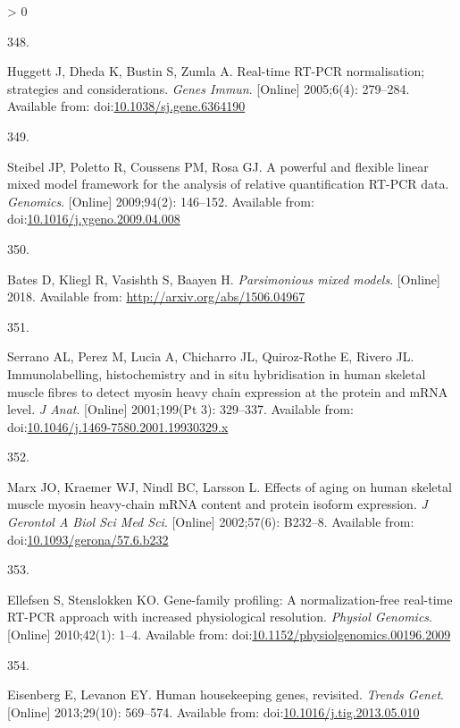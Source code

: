 \documentclass[twoside,10pt]{gihclass} %
\newlength{\cslhangindent}
\newlength{\csllabelwidth}
\newenvironment{CSLReferences}[3] %
 {%
  \setlength{\parindent}{0pt}
  \ifodd #1 \everypar{\setlength{\hangindent}{\cslhangindent}}\ignorespaces\fi
  \ifnum #2 > 0
  \setlength{\parskip}{#2\baselineskip}
  \fi
 }%
 {}
\newcommand{\CSLLeftMargin}[1]{\parbox[t]{\maxof{\widthof{#1}}{\csllabelwidth}}{#1}}
\newcommand{\CSLRightInline}[1]{\parbox[t]{\linewidth}{#1}}
\begin{document}
\begin{CSLReferences}{0}{0}
\leavevmode\hypertarget{ref-RN1984}{}%
\CSLLeftMargin{348. }
\CSLRightInline{Huggett J, Dheda K, Bustin S, Zumla A. Real-time RT-PCR normalisation; strategies and considerations. \emph{Genes Immun}. {[}Online{]} 2005;6(4): 279--284. Available from: doi:\href{https://doi.org/10.1038/sj.gene.6364190}{10.1038/sj.gene.6364190}}

\leavevmode\hypertarget{ref-RN1154}{}%
\CSLLeftMargin{349. }
\CSLRightInline{Steibel JP, Poletto R, Coussens PM, Rosa GJ. A powerful and flexible linear mixed model framework for the analysis of relative quantification RT-PCR data. \emph{Genomics}. {[}Online{]} 2009;94(2): 146--152. Available from: doi:\href{https://doi.org/10.1016/j.ygeno.2009.04.008}{10.1016/j.ygeno.2009.04.008}}

\leavevmode\hypertarget{ref-bates2018parsimonious}{}%
\CSLLeftMargin{350. }
\CSLRightInline{Bates D, Kliegl R, Vasishth S, Baayen H. \emph{Parsimonious mixed models}. {[}Online{]} 2018. Available from: \url{http://arxiv.org/abs/1506.04967}}

\leavevmode\hypertarget{ref-RN2444}{}%
\CSLLeftMargin{351. }
\CSLRightInline{Serrano AL, Perez M, Lucia A, Chicharro JL, Quiroz-Rothe E, Rivero JL. Immunolabelling, histochemistry and in situ hybridisation in human skeletal muscle fibres to detect myosin heavy chain expression at the protein and mRNA level. \emph{J Anat}. {[}Online{]} 2001;199(Pt 3): 329--337. Available from: doi:\href{https://doi.org/10.1046/j.1469-7580.2001.19930329.x}{10.1046/j.1469-7580.2001.19930329.x}}

\leavevmode\hypertarget{ref-RN2445}{}%
\CSLLeftMargin{352. }
\CSLRightInline{Marx JO, Kraemer WJ, Nindl BC, Larsson L. Effects of aging on human skeletal muscle myosin heavy-chain mRNA content and protein isoform expression. \emph{J Gerontol A Biol Sci Med Sci}. {[}Online{]} 2002;57(6): B232--8. Available from: doi:\href{https://doi.org/10.1093/gerona/57.6.b232}{10.1093/gerona/57.6.b232}}

\leavevmode\hypertarget{ref-RN825}{}%
\CSLLeftMargin{353. }
\CSLRightInline{Ellefsen S, Stenslokken KO. Gene-family profiling: A normalization-free real-time RT-PCR approach with increased physiological resolution. \emph{Physiol Genomics}. {[}Online{]} 2010;42(1): 1--4. Available from: doi:\href{https://doi.org/10.1152/physiolgenomics.00196.2009}{10.1152/physiolgenomics.00196.2009}}

\leavevmode\hypertarget{ref-RN1759}{}%
\CSLLeftMargin{354. }
\CSLRightInline{Eisenberg E, Levanon EY. Human housekeeping genes, revisited. \emph{Trends Genet}. {[}Online{]} 2013;29(10): 569--574. Available from: doi:\href{https://doi.org/10.1016/j.tig.2013.05.010}{10.1016/j.tig.2013.05.010}}

\end{CSLReferences}

\end{document}
